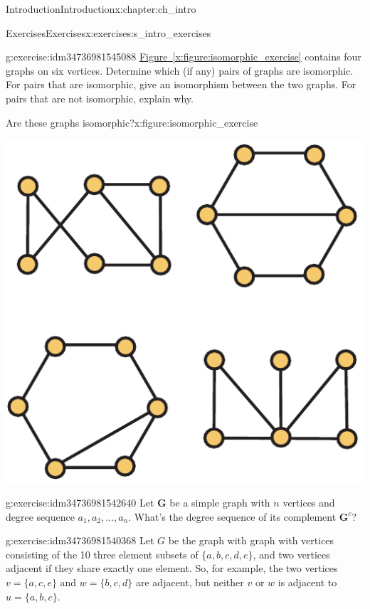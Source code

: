 \documentclass[oneside,10pt,]{book}
\newcommand{\xreffont}{\relax}
\numberwithin{equation}{section}
\newcommand{\bfG}{\mathbf{G}}
\begin{document}
\begin{chapterptx}{Introduction}{}{Introduction}{}{}{x:chapter:ch_intro}
\begin{exercises-section}{Exercises}{}{Exercises}{}{}{x:exercises:s_intro_exercises}
\begin{divisionexercise}{3}{}{}{g:exercise:idm34736981545088}
\hyperref[x:figure:isomorphic_exercise]{Figure~{\xreffont\ref{x:figure:isomorphic_exercise}}} contains four graphs on six vertices. Determine which (if any) pairs of graphs are isomorphic. For pairs that are isomorphic, give an isomorphism between the two graphs. For pairs that are not isomorphic, explain why.%
\begin{figureptx}{Are these graphs isomorphic?}{x:figure:isomorphic_exercise}{}%
\begin{image}{0.225}{0.55}{0.225}%
\includegraphics[width=\linewidth]{images/isomorphic_ex}
\end{image}%
\tcblower
\end{figureptx}%
\end{divisionexercise}%
\begin{divisionexercise}{4}{}{}{g:exercise:idm34736981542640}%
Let \(\bfG\) be a simple graph with \(n\) vertices and degree sequence \(a_1,a_2,\dots,a_n\).  What's the degree sequence of its complement \(\bfG^c\)?%
\end{divisionexercise}%
\begin{divisionexercise}{5}{}{}{g:exercise:idm34736981540368}%
Let \(G\) be the graph with graph with vertices consisting of the 10 three element subsets of \(\{a,b,c,d,e\}\), and two vertices adjacent if they share exactly one element.  So, for example, the two vertices \(v=\{a,c,e\}\) and \(w=\{b,c,d\}\) are adjacent, but neither \(v\) or \(w\) is adjacent to \(u=\{a,b,c\}\).%

\end{divisionexercise}
\end{exercises-section}
\end{chapterptx}
\end{document}

